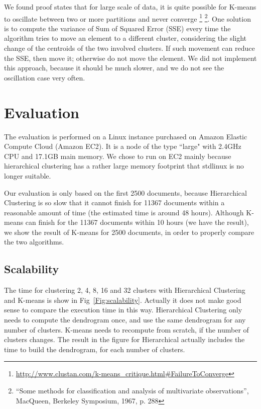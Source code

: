 \documentclass{article}
\begin{document}
We found proof states that for large scale of data, it is quite possible for
K-means to oscillate between two or more partitions and never converge
\footnote{\url{http://www.clustan.com/k-means_critique.html\#FailureToConverge}}
\footnote{``Some methods for classification and analysis of multivariate
observations'', MacQueen, Berkeley Symposium, 1967, p. 288}. One solution is to
compute the variance of Sum of Squared Error (SSE) every time the algorithm
tries to move an element to a different cluster, considering the slight change
of the centroids of the two involved clusters. If such movement can reduce the
SSE, then move it; otherwise do not move the element. We did not implement this
approach, because it should be much slower, and we do not see the oscillation
case very often.

\section{Evaluation}

The evaluation is performed on a Linux instance purchased on Amazon Elastic
Compute Cloud (Amazon EC2). It is a node of the type ``large" with 2.4GHz
CPU and 17.1GB main memory. We chose to run on EC2 mainly because hierarchical
clustering has a rather large memory footprint that stdlinux is no longer
suitable.

Our evaluation is only based on the first 2500 documents, because Hierarchical
Clustering is so slow that it cannot finish for 11367 documents within a
reasonable amount of time (the estimated time is around 48 hours). Although
K-means can finish for the 11367 documents within 10 hours (we have the result),
we show the result of K-means for 2500 documents, in order to properly compare
the two algorithms.

\subsection{Scalability}
The time for clustering 2, 4, 8, 16 and 32 clusters with Hierarchical Clustering
and K-means is show in Fig~\ref{Fig:scalability}. Actually it does not make good
sense to compare the execution time in this way. Hierarchical Clustering only
needs to compute the dendrogram once, and use the same dendrogram for any number
of clusters. K-means needs to recompute from scratch, if the number
of clusters changes. The result in the figure for Hierarchical actually
includes the time to build the dendrogram, for each number of clusters.
\end{document}
